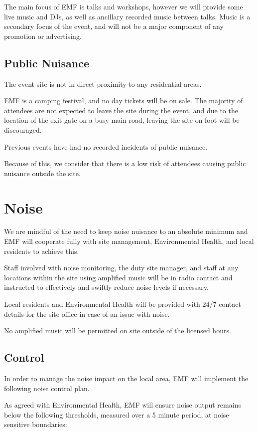 The main focus of EMF is talks and workshops, however we will provide some live music and DJs,
as well as ancillary recorded music between talks. Music is a secondary focus of the
event, and will not be a major component of any promotion or advertising.

\subsection{Public Nuisance}

The event site is not in direct proximity to any residential areas.

EMF is a camping festival, and no day tickets will be on sale. The majority of attendees are not expected to leave the site
during the event, and due to the location of the exit gate on a busy main road, leaving the site on foot will be discouraged.

Previous events have had no recorded incidents of public nuisance.

Because of this, we consider that there is a low risk of attendees causing public nuisance outside the site.

\section{Noise}

We are mindful of the need to keep noise nuisance to an absolute minimum and EMF will cooperate fully
with site management, Environmental Health, and local residents to achieve this.

Staff involved with noise monitoring, the duty site manager, and staff at any locations within the site
using amplified music will be in radio contact and instructed to effectively and swiftly reduce noise
levels if necessary.

Local residents and Environmental Health will be provided with 24/7 contact details for the site office
in case of an issue with noise.

No amplified music will be permitted on site outside of the licensed hours.

\subsection{Control}

In order to manage the noise impact on the local area, EMF will implement the following noise control plan.

As agreed with Environmental Health, EMF will ensure noise output remains below the following thresholds,
measured over a 5 minute period, at noise sensitive boundaries:

